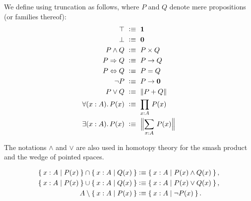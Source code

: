 \documentclass[hott-all.tex]{subfiles}
\begin{document}
\begin{defn} \label{defn:logical-notation}
  We define 
  using truncation as follows, where $P$ and $Q$ denote mere propositions (or families thereof):
  {\allowdisplaybreaks
  \begin{align*}
    \top            &\ \defeq \ \unit \\
    \bot            &\ \defeq \ \emptyt \\
    P \land Q       &\ \defeq \ P \times Q \\
    P \Rightarrow Q &\ \defeq \ P \to Q \\
    P \Leftrightarrow Q &\ \defeq \ P = Q \\
    \neg P          &\ \defeq \ P \to \emptyt \\
    P \lor Q        &\ \defeq \ \brck{P + Q} \\
    \fall{x : A} P(x) &\ \defeq \ \prd{x : A} P(x) \\
    \exis{x : A} P(x) &\ \defeq \ \Brck{\sm{x : A} P(x)}
  \end{align*}}
\end{defn}

The notations $\land$ and $\lor$ are also used in homotopy theory for the smash
product and the wedge of pointed spaces.

\begin{align*}
  \Set{x:A | P(x)} \cap \Set{x:A | Q(x)}
  &\vcentcolon\equiv \Set{x:A | P(x) \land Q(x)},\\
  \Set{x:A | P(x)} \cup \Set{x:A | Q(x)}
  &\vcentcolon\equiv \Set{x:A | P(x) \lor Q(x)},\\
  A \setminus \Set{x:A | P(x)}
  &\vcentcolon\equiv \Set{x:A | \neg P(x)}.
\end{align*}
\end{document}
